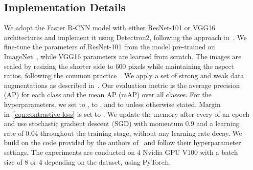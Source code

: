 \documentclass{bmvc2k}
\begin{document}
\subsection{Implementation Details}\label{sec:implementation_details}
We adopt the Faster R-CNN model with either ResNet-101 or VGG16 architectures and implement it using Detectron2, following the approach in~\cite{saito2019strong, xu2020cross, tian2021knowledge, li2022cross}. We fine-tune the parameters of ResNet-101 from the model pre-trained on ImageNet~\cite{deng2009imagenet}, while VGG16 parameters are learned from scratch. The images are scaled by resizing the shorter side to 600 pixels while maintaining the aspect ratios, following the common practice~\cite{he2019multi}. We apply a set of strong and weak data augmentations as described in~\cite{li2022cross}. Our evaluation metric is the average precision (AP) for each class and the mean AP (mAP) over all classes.
For the hyperparameters, we set  to ,  to , and  to  unless otherwise stated. Margin  in~\cref{eqn:contrastive loss} is set to . We update the memory after every  of an epoch and use stochastic gradient descent (SGD) with momentum 0.9 and a learning rate of 0.04 throughout the training stage, without any learning rate decay. We build on the code provided by the authors of~\cite{li2022cross} and follow their hyperparameter settings. The experiments are conducted on 4 Nvidia GPU V100 with a batch size of 8 or 4 depending on the dataset, using PyTorch.
\end{document}

